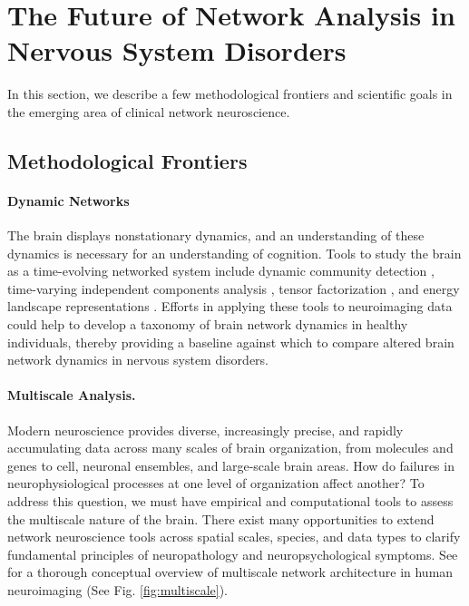 \documentclass[12pt]{article}
\begin{document}
\section*{The Future of Network Analysis in Nervous System Disorders}

In this section, we describe a few methodological frontiers and scientific goals in the emerging area of clinical network neuroscience. 

\subsection*{Methodological Frontiers}

\paragraph*{Dynamic Networks}

The brain displays nonstationary dynamics, and an understanding of these dynamics is necessary for an understanding of cognition. Tools to study the brain as a time-evolving networked system include dynamic community detection \cite{Bassett2013}, time-varying independent components analysis \cite{Calhoun2014}, tensor factorization \cite{lee2007nonnegative}, and energy landscape representations \cite{watanabe2014energy}. Efforts in applying these tools to neuroimaging data could help to develop a taxonomy of brain network dynamics in healthy individuals, thereby providing a baseline against which to compare altered brain network dynamics in nervous system disorders.

\paragraph{Multiscale Analysis.}

Modern neuroscience provides diverse, increasingly precise, and rapidly accumulating data across many scales of brain organization, from molecules and genes to cell, neuronal ensembles, and large-scale brain areas. How do failures in neurophysiological processes at one level of organization affect another? To address this question, we must have empirical and computational tools to assess the multiscale nature of the brain. There exist many opportunities to extend network neuroscience tools across spatial scales, species, and data types to clarify fundamental principles of neuropathology and neuropsychological symptoms. See \cite{betzel2016multi} for a thorough conceptual overview of multiscale network architecture in human neuroimaging (See Fig. \ref{fig:multiscale}). 
\end{document}
